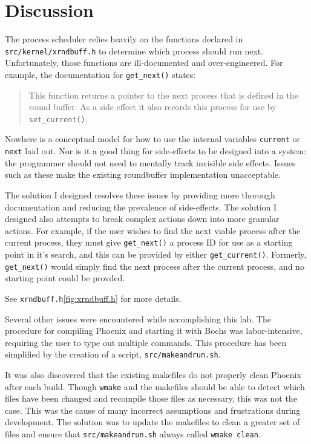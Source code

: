 \documentclass{article}
\begin{document}
\section{Discussion}
\label{sec:discussion}

The process scheduler relies heavily on the functions declared in
\texttt{src/kernel/xrndbuff.h} to determine which process should run next.
Unfortunately, those functions are ill-documented and over-engineered. For
example, the documentation for \texttt{get\_next()} states:

\begin{quote}
This function returns a pointer to the next process that is defined in
the round buffer. As a side effect it also records this process for use by
\texttt{set\_current()}.
\end{quote}

Nowhere is a conceptual model for how to use the internal variables
\texttt{current} or \texttt{next} laid out. Nor is it a good thing for
side-effects to be designed into a system: the programmer should not need to
mentally track invisible side effects. Issues such as these make the existing
roundbuffer implementation unacceptable.

The solution I designed resolves these issues by providing more thorough
documentation and reducing the prevalence of side-effects. The solution I
designed also attempts to break complex actions down into more granular actions.
For example, if the user wishes to find the next viable process after the
current process, they must give \texttt{get\_next()} a process ID for use as a
starting point in it's search, and this can be provided by either
\texttt{get\_current()}. Formerly, \texttt{get\_next()} would simply find the
next process after the current process, and no starting point could be provded.

See \texttt{xrndbuff.h}\ref{fig:xrndbuff.h} for more details.

Several other issues were encountered while accomplishing this lab. The
procedure for compiling Phoenix and starting it with Bochs was labor-intensive,
requiring the user to type out multiple commands. This procedure has been
simplified by the creation of a script, \texttt{src/makeandrun.sh}.

It was also discovered that the existing makefiles do not properly clean Phoenix
after each build. Though \texttt{wmake} and the makefiles should be able to
detect which files have been changed and recompile those files as necessary,
this was not the case. This was the cause of many incorrect assumptions and
frustrations during development. The solution was to update the makefiles to
clean a greater set of files and ensure that \texttt{src/makeandrun.sh} always
called \texttt{wmake clean}.
\end{document}
